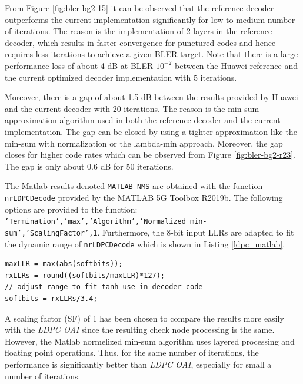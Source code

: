 \documentclass{article}
\begin{document}
From Figure \ref{fig:bler-bg2-15} it can be observed that the reference decoder outperforms the current implementation significantly for low to medium number of iterations. The reason is the implementation of 2 layers in the reference decoder, which results in faster convergence for punctured codes and hence requires less iterations to achieve a given BLER target. Note that there is a large performance loss of about 4 dB at BLER $10^{-2}$ between the Huawei reference and the current optimized decoder implementation with 5 iterations.

Moreover, there is a gap of about 1.5 dB between the results provided by Huawei and the current decoder with 20 iterations. The reason is the min-sum approximation algorithm used in both the reference decoder and the current implementation. The gap can be closed by using a tighter approximation like the min-sum with normalization or the lambda-min approach. Moreover, the gap closes for higher code rates which can be observed from Figure \ref{fig:bler-bg2-r23}. The gap is only about 0.6 dB for 50 iterations.

The Matlab results denoted \texttt{MATLAB NMS} are obtained with the function \texttt{nrLDPCDecode} provided by the MATLAB 5G Toolbox R2019b. The following options are provided to the function: \texttt{'Termination','max','Algorithm','Normalized min-sum','ScalingFactor',1}. Furthermore, the 8-bit input LLRs are adapted to fit the dynamic range of \texttt{nrLDPCDecode} which is shown in Listing \ref{ldpc_matlab}. 

\begin{lstlisting}[frame=single,caption={Input adaptation for MATLAB LDPC Decoder},label=ldpc_matlab]
maxLLR = max(abs(softbits));
rxLLRs = round((softbits/maxLLR)*127);
// adjust range to fit tanh use in decoder code 
softbits = rxLLRs/3.4;
\end{lstlisting}

A scaling factor (SF) of 1 has been chosen to compare the results more easily with the \textit{LDPC OAI} since the resulting check node processing is the same. However, the Matlab normelized min-sum algorithm uses layered processing and floating point operations. Thus, for the same number of iterations, the performance is significantly better than \textit{LDPC OAI}, especially for small a number of iterations.
\end{document}
